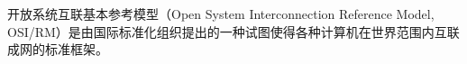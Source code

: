 
开放系统互联基本参考模型（Open System Interconnection Reference Model, OSI/RM）是由国际标准化组织提出的一种试图使得各种计算机在世界范围内互联成网的标准框架。